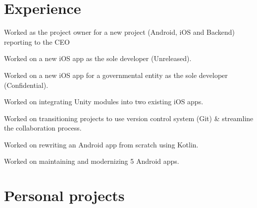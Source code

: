 \documentclass[]{Resume}
\begin{document}
\begin{minipage}[t]{0.66\textwidth} 


\section{Experience}
\vspace{\topsep} %
\begin{tightemize}
\item Worked as the project owner for a new project (Android, iOS and Backend) reporting to the CEO
\item Worked on a new iOS app as the sole developer (Unreleased).
\item Worked on a new iOS app for a governmental entity as the sole developer (Confidential).
\item Worked on integrating Unity modules into two existing iOS apps.
\item Worked on transitioning projects to use version control system (Git) \& streamline the collaboration process.
\item Worked on rewriting an Android app from scratch using Kotlin.
\item Worked on maintaining and modernizing 5 Android apps.
\end{tightemize}
\sectionsep


\section{Personal projects}


\end{minipage}
\end{document}
